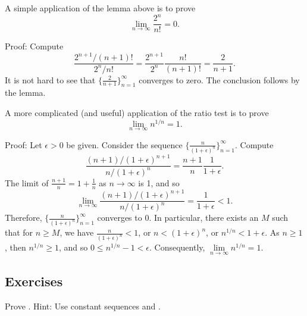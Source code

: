 \begin{example}
A simple application of the lemma above is to prove 
\begin{equation*}
\lim_{n\to\infty} \frac{2^n}{n!} = 0 .
\end{equation*}

Proof:
Compute
\begin{equation*}
\frac{2^{n+1} / (n+1)!}{2^n/n!}
=
\frac{2^{n+1}}{2^n}\frac{n!}{(n+1)!}
=
\frac{2}{n+1} .
\end{equation*}
It is not hard to see that $\bigl\{ \frac{2}{n+1} \bigr\}_{n=1}^\infty$ converges to zero.
The conclusion follows by the lemma.
\end{example}

\begin{example} \label{example:nto1overn}
A more complicated (and useful) application of the ratio test is to prove 
\begin{equation*}
\lim_{n\to\infty} n^{1/n} = 1 .
\end{equation*}

Proof:
Let $\epsilon > 0$ be given.  Consider the sequence
$\bigl\{ \frac{n}{{(1+\epsilon)}^n} \bigr\}_{n=1}^\infty$.  Compute
\begin{equation*}
\frac{(n+1)/{(1+\epsilon)}^{n+1}}{n/{(1+\epsilon)}^{n}}
=
\frac{n+1}{n} \frac{1}{1+\epsilon} .
\end{equation*}
The limit of $\frac{n+1}{n} = 1+\frac{1}{n}$ as $n \to \infty$ is 1, and so
\begin{equation*}
\lim_{n\to \infty} \frac{(n+1)/{(1+\epsilon)}^{n+1}}{n/{(1+\epsilon)}^{n}}
=
\frac{1}{1+\epsilon}  < 1 .
\end{equation*}
Therefore, $\bigl\{ \frac{n}{{(1+\epsilon)}^n} \bigr\}_{n=1}^\infty$ converges to 0.
In particular,
there exists an $M$ such that for $n \geq M$, we have
$\frac{n}{{(1+\epsilon)}^n} < 1$, or 
$n < {(1+\epsilon)}^n$, or 
$n^{1/n} < 1+\epsilon$.  As $n \geq 1$, then $n^{1/n} \geq 1$, and
so $0 \leq n^{1/n}-1 < \epsilon$. Consequently,
$\lim\limits_{n\to\infty} n^{1/n} = 1$.
\end{example}

\subsection{Exercises}

\begin{exercise}
Prove .  Hint: Use constant sequences
and .
\end{exercise}

